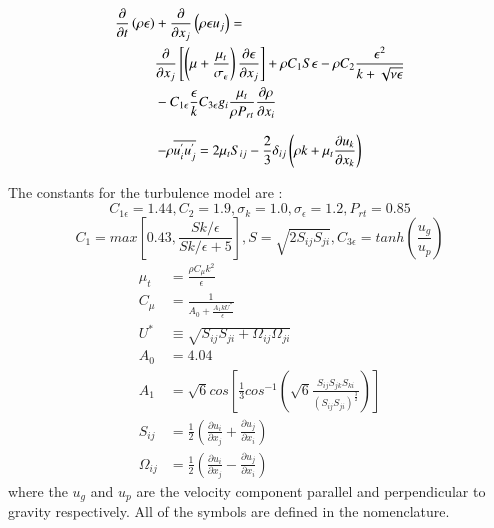 \documentclass[preprint,12pt]{elsarticle}
\begin{document}
\begin{equation}
\centering
\begin{split}
 \frac{\partial }{\partial t} \left(\rho \epsilon \right) &+ \frac{\partial }{\partial x_j} \left( \rho \epsilon u_j \right) = \\
 &\frac{\partial }{\partial x_j } \left[ \left( \mu + \frac{\mu_t }{\sigma_\epsilon } \right) \frac{\partial \epsilon }{\partial x_j } \right] + \rho C_1 S \epsilon - \rho C_2 \frac{\epsilon^2 }{k+\sqrt{\nu \epsilon}} \\
 &- C_{1 \epsilon} \frac{\epsilon}{k} C_{3\epsilon} g_i \frac{\mu_t}{\rho P_{rt}} \frac{\partial \rho}{\partial x_i}
\label{eq:e}
\end{split}
\end{equation}

\begin{equation}
\centering
- \rho \overline{u^{'}_{i} u^{'}_{j}} = 2\mu_t S_{ij} - \frac{2}{3} \delta_{ij} \left( \rho k + \mu_t \frac{\partial u_k}{\partial x_k} \right)
\label{eq:reynoldsstress}
\end{equation}

The constants for the turbulence model are \cite{realizable,fluent} : 
\begin{equation}
\label{eq:constants}
C_{1\epsilon} = 1.44 , C_2 = 1.9 , \sigma_k = 1.0 , \sigma_\epsilon = 1.2 , P_{rt} = 0.85 
\end{equation}
\begin{equation}
C_1 = max\left[0.43,\frac{Sk/\epsilon}{Sk/\epsilon +5} \right] , S = \sqrt{2S_{ij}S_{ji}} , C_{3\epsilon} = tanh\left(\frac{u_g}{u_p}\right)
\end{equation}
\begin{subequations}
\begin{align}
\mu_t &= \frac{\rho C_{\mu} k^2}{\epsilon} \\
C_{\mu} &= \frac{1}{A_0 + \frac{A_1 k U^*}{\epsilon}} \\
U^* &\equiv \sqrt{S_{ij} S_{ji} + \Omega_{ij} \Omega_{ji}} \\
A_0 &= 4.04 \\
A_1 &= \sqrt{6} cos \left[\frac{1}{3} cos^{-1}\left(\sqrt{6} \frac{S_{ij}S_{jk}S_{ki}}{\left(S_{ij} S_{ji} \right)^{\frac{3}{2}}} \right) \right] \\
S_{ij} &= \frac{1}{2} \left( \frac{\partial u_i}{\partial x_j} + \frac{\partial u_j}{\partial x_i} \right) \\
\Omega_{ij} &= \frac{1}{2} \left( \frac{\partial u_i}{\partial x_j} - \frac{\partial u_j}{\partial x_i} \right)
\end{align}
\end{subequations}
where the $u_g$ and $u_p$ are the velocity component parallel and perpendicular to gravity respectively.  All of the symbols are defined in the nomenclature.
\end{document}
